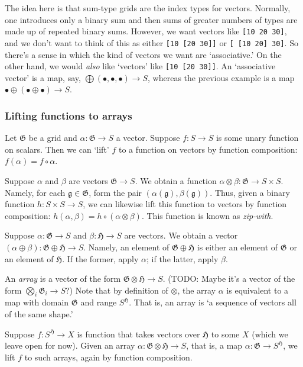 \documentclass[11pt]{article}
\newcommand{\gr}[1]{\mathfrak{#1}}
\newcommand{\GG}{\gr{G}}
\newcommand{\unit}{\bullet}
\begin{document}
The idea here is that sum-type grids are the index types for vectors. Normally,
one introduces only a binary sum and then sums of greater numbers of types are
made up of repeated binary sums. However, we want vectors like \texttt{[10 20 30]}, and
we don't want to think of this as either \texttt{[10 [20 30]]} or \texttt{[ [10 20] 30]}.  So
there's a sense in which the kind of vectors we want are ‘associative.’ On the
other hand, we would \emph{also} like ‘vectors’ like \texttt{[10 [20 30]]}. An ‘associative
vector’ is a map, say, \(\bigoplus(\unit, \unit, \unit)\to S\), whereas the
previous example is a map \(\unit\oplus (\unit\oplus \unit)\to S\).

\subsubsection{Lifting functions to arrays}
\label{sec:orgc0391ab}

Let \(\GG\) be a grid and \(\alpha:\GG\to S\) a vector. Suppose \(f:S\to S\) is some
unary function on scalars. Then we can ‘lift’ \(f\) to a function on vectors by
function composition: \(f(\alpha) = f\circ\alpha\).

Suppose \(\alpha\) and \(\beta\) are vectors \(\GG\to S\). We obtain a function
\(\alpha\otimes\beta : \GG\to S\times S\). Namely, for each \(\mathfrak{g}\in \GG\),
form the pair \((\alpha(\mathfrak{g}), \beta(\mathfrak{g}))\). Thus, given a
binary function \(h : S\times S\to S\), we can likewise lift this function to
vectors by function composition: \(h(\alpha, \beta) = h\circ
(\alpha\otimes\beta)\). This function is known as \emph{zip-with}.

Suppose \(\alpha : \gr{G}\to S\) and \(\beta : \gr{H}\to S\) are vectors. We obtain
a vector \((\alpha\oplus\beta) : \gr{G}\oplus\gr{H}\to S\). Namely, an element of
\(\gr{G}\oplus\gr{H}\) is either an element of \(\gr{G}\) or an element of
\(\gr{H}\). If the former, apply \(\alpha\); if the latter, apply \(\beta\). 

An \emph{array} is a vector of the form \(\gr{G}\otimes\gr{H}\to S\). (TODO: Maybe it's
a vector of the form \(\bigotimes_i \gr{G}_i\to S\)?) Note that by definition of
\(\otimes\), the array \(\alpha\) is equivalent to a map with domain \(\gr{G}\) and
range \(S^\gr{H}\). That is, an array is ‘a sequence of vectors all of the same
shape.’

Suppose \(f:S^\gr{H}\to X\) is function that takes vectors over \(\gr{H}\) to
some \(X\) (which we leave open for now). Given an array \(\alpha : \gr{G}\otimes
\gr{H}\to S\), that is, a map \(\alpha : \gr{G}\to S^\gr{H}\), we lift \(f\) to
such arrays, again by function composition.
\end{document}
